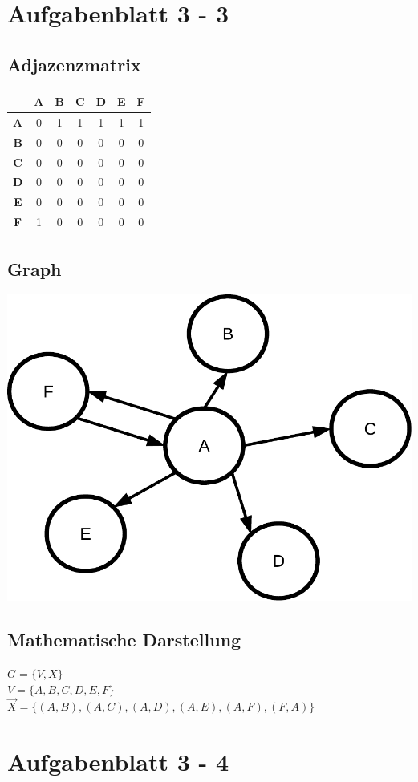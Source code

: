 \documentclass[a4paper, 11pt]{article}
\begin{document}
\pagebreak

\section*{Aufgabenblatt 3 - 3}

\subsection*{Adjazenzmatrix}
\begin{tabular}{ |c|c|c|c|c|c|c| }
\hline
 & \textbf{A} & \textbf{B} & \textbf{C} & \textbf{D} & \textbf{E} & \textbf{F} \\
\hline
\textbf{A} & 0 & 1 & 1 & 1 & 1 & 1 \\
\hline
\textbf{B} & 0 & 0 & 0 & 0 & 0 & 0 \\
\hline
\textbf{C} & 0 & 0 & 0 & 0 & 0 & 0 \\
\hline
\textbf{D} & 0 & 0 & 0 & 0 & 0 & 0 \\
\hline
\textbf{E} & 0 & 0 & 0 & 0 & 0 & 0 \\
\hline
\textbf{F} & 1 & 0 & 0 & 0 & 0 & 0 \\
\hline
\end{tabular}

\subsection*{Graph}
\includegraphics[width=0.5\linewidth]{img/pdf/Aufgabe_3-3}


\subsection*{Mathematische Darstellung}
\( G = \{ V , X \} \) \\
\( V = \{ A , B , C , D , E , F \} \)  \\
\( \vec X = \{ (A,B) , (A,C) , (A,D) , (A,E) , (A,F) , (F,A) \} \)

\pagebreak

\section*{Aufgabenblatt 3 - 4}
\end{document}
